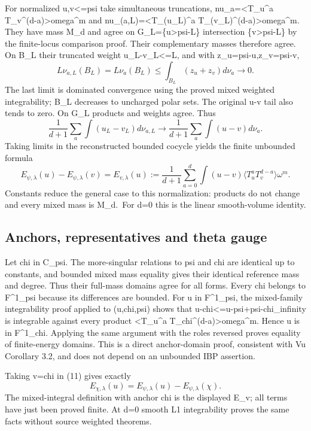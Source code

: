 \documentclass[
]{article}
\begin{document}
For normalized u,v\textless=psi take simultaneous truncations,
nu\_a=\textless T\_u\^{}a T\_v\^{}(d-a)\textgreater omega\^{}m and
nu\_(a,L)=\textless T\_(u\_L)\^{}a
T\_(v\_L)\^{}(d-a)\textgreater omega\^{}m. They have mass M\_d and agree
on G\_L=\{u\textgreater psi-L\} intersection \{v\textgreater psi-L\} by
the finite-locus comparison proof. Their complementary masses therefore
agree. On B\_L their truncated weight
\textbar u\_L-v\_L\textbar\textless=L, and with z\_u=psi-u,z\_v=psi-v,
\[
L\nu_{a,L}(B_L)=L\nu_a(B_L)
\leq\int_{B_L}(z_u+z_v)d\nu_a\longrightarrow0.
\] The last limit is dominated convergence using the proved mixed
weighted integrability; B\_L decreases to uncharged polar sets. The
original \textbar u-v\textbar{} tail also tends to zero. On G\_L
products and weights agree. Thus \[
\frac1{d+1}\sum_a\int(u_L-v_L)d\nu_{a,L}
\longrightarrow\frac1{d+1}\sum_a\int(u-v)d\nu_a.
\] Taking limits in the reconstructed bounded cocycle yields the finite
unbounded formula \[
E_{\psi,\lambda}(u)-E_{\psi,\lambda}(v)
=E_{v,\lambda}(u)
:=\frac1{d+1}\sum_{a=0}^d\int(u-v)\langle T_u^aT_v^{d-a}\rangle\omega^m.\tag{11}
\] Constants reduce the general case to this normalization: products do
not change and every mixed mass is M\_d.~For d=0 this is the linear
smooth-volume identity.

\subsection{Anchors, representatives and theta
gauge}\label{anchors-representatives-and-theta-gauge}

Let chi in C\_psi. The more-singular relations to psi and chi are
identical up to constants, and bounded mixed mass equality gives their
identical reference mass and degree. Thus their full-mass domains agree
for all forms. Every chi belongs to F\^{}1\_psi because its differences
are bounded. For u in F\^{}1\_psi, the mixed-family integrability proof
applied to (u,chi,psi) shows that
\textbar u-chi\textbar\textless=\textbar u-psi\textbar+\textbar\textbar psi-chi\textbar\textbar\_infinity
is integrable against every product \textless T\_u\^{}a
T\_chi\^{}(d-a)\textgreater omega\^{}m. Hence u is in F\^{}1\_chi.
Applying the same argument with the roles reversed proves equality of
finite-energy domains. This is a direct anchor-domain proof, consistent
with Vu Corollary 3.2, and does not depend on an unbounded IBP
assertion.

Taking v=chi in (11) gives exactly \[
E_{\chi,\lambda}(u)=E_{\psi,\lambda}(u)-E_{\psi,\lambda}(\chi).\tag{12}
\] The mixed-integral definition with anchor chi is the displayed E\_v;
all terms have just been proved finite. At d=0 smooth L1 integrability
proves the same facts without source weighted theorems.
\end{document}
